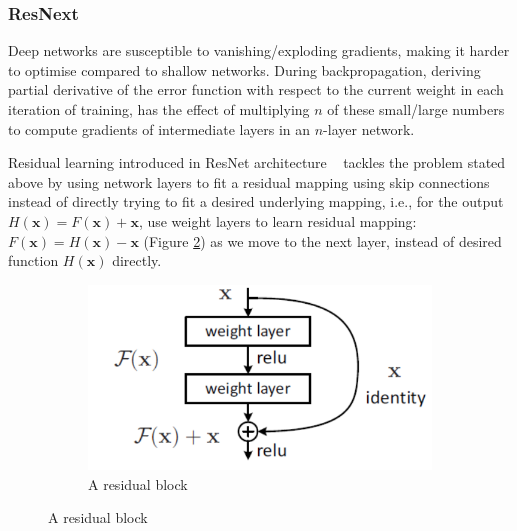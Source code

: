 \documentclass{beamer}
\begin{document}
\begin{frame}[allowframebreaks]
\frametitle{ResNext}
Deep networks are susceptible to vanishing/exploding gradients, making it harder to optimise compared to shallow networks. During backpropagation, deriving partial derivative of the error function with respect to the current weight in each iteration of training, has the effect of multiplying $n$ of these small/large numbers to compute gradients of intermediate layers in an $n$-layer network.

Residual learning introduced in ResNet architecture {~\cite{He2015DeepRL}} tackles the problem stated above by using network layers to fit a residual mapping using skip connections instead of directly trying to fit a desired underlying mapping, i.e., for the output $H(\bm{x})= F(\bm{x}) + \bm{x}$, use weight layers to learn residual mapping: $F(\bm{x}) = H(\bm{x})-\bm{x}$ (Figure \ref{subfig:residual_block}) as we move to the next layer, instead of desired function $H(\bm{x})$ directly.
\begin{figure}[H]
\centering
	\begin{subfigure}[t]{\textwidth}
	\centering
	\includegraphics[scale=0.5]{png/residual_block.png}
 	\caption{A residual block}	 
	\label{subfig:residual_block}
	\end{subfigure}
	
	\medskip
	

\end{figure}
\end{frame}
\end{document}
